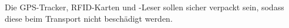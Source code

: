 Die GPS-Tracker, RFID-Karten und -Leser sollen sicher verpackt sein, sodass diese beim Transport nicht beschädigt werden.